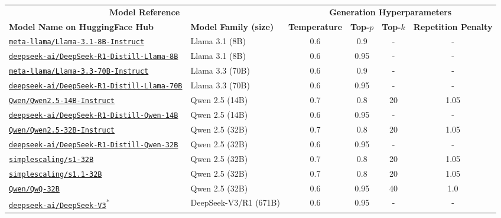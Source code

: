 \begin{table}[t]
\scriptsize
\centering
\begin{tabular}{llcccc}
\toprule
\multicolumn{2}{c}{\textbf{Model Reference}} & \multicolumn{4}{c}{\textbf{Generation Hyperparameters}} \\
\cmidrule(lr){1-2} \cmidrule(lr){3-6}
\textbf{Model Name on HuggingFace Hub} & \textbf{Model Family (size)} & \textbf{Temperature} & \textbf{Top-$p$} & \textbf{Top-$k$} & \textbf{Repetition Penalty} \\
\midrule
\href{https://huggingface.co/meta-llama/Llama-3.1-8B-Instruct}{\texttt{meta-llama/Llama-3.1-8B-Instruct}} & Llama 3.1 (8B) & 0.6 & 0.9 & - & - \\
\href{https://huggingface.co/deepseek-ai/DeepSeek-R1-Distill-Llama-8B}{\texttt{deepseek-ai/DeepSeek-R1-Distill-Llama-8B}} & Llama 3.1 (8B) & 0.6 & 0.95 & - & - \\
\href{https://huggingface.co/meta-llama/Llama-3.3-70B-Instruct}{\texttt{meta-llama/Llama-3.3-70B-Instruct}} & Llama 3.3 (70B) & 0.6 & 0.9 & - & - \\
\href{https://huggingface.co/deepseek-ai/DeepSeek-R1-Distill-Llama-70B}{\texttt{deepseek-ai/DeepSeek-R1-Distill-Llama-70B}} & Llama 3.3 (70B) & 0.6 & 0.95 & - & - \\
\href{https://huggingface.co/Qwen/Qwen2.5-14B-Instruct}{\texttt{Qwen/Qwen2.5-14B-Instruct}} & Qwen 2.5 (14B) & 0.7 & 0.8 & 20 & 1.05 \\
\href{https://huggingface.co/deepseek-ai/DeepSeek-R1-Distill-Qwen-14B}{\texttt{deepseek-ai/DeepSeek-R1-Distill-Qwen-14B}} & Qwen 2.5 (14B) & 0.6 & 0.95 & - & - \\
\href{https://huggingface.co/Qwen/Qwen2.5-32B-Instruct}{\texttt{Qwen/Qwen2.5-32B-Instruct}} & Qwen 2.5 (32B) & 0.7 & 0.8 & 20 & 1.05 \\
\href{https://huggingface.co/deepseek-ai/DeepSeek-R1-Distill-Qwen-32B}{\texttt{deepseek-ai/DeepSeek-R1-Distill-Qwen-32B}} & Qwen 2.5 (32B) & 0.6 & 0.95 & - & - \\
\href{https://huggingface.co/simplescaling/s1-32B}{\texttt{simplescaling/s1-32B}} & Qwen 2.5 (32B) & 0.7 & 0.8 & 20 & 1.05 \\
\href{https://huggingface.co/simplescaling/s1.1-32B}{\texttt{simplescaling/s1.1-32B}} & Qwen 2.5 (32B) & 0.7 & 0.8 & 20 & 1.05 \\
\href{https://huggingface.co/Qwen/QwQ-32B}{\texttt{Qwen/QwQ-32B}} & Qwen 2.5 (32B) & 0.6 & 0.95 & 40 & 1.0 \\
\href{https://huggingface.co/deepseek-ai/DeepSeek-V3}{\texttt{deepseek-ai/DeepSeek-V3}}\textsuperscript{*} & DeepSeek-V3/R1 (671B) & 0.6 & 0.95 & - & - \\

\end{tabular}
\end{table}
